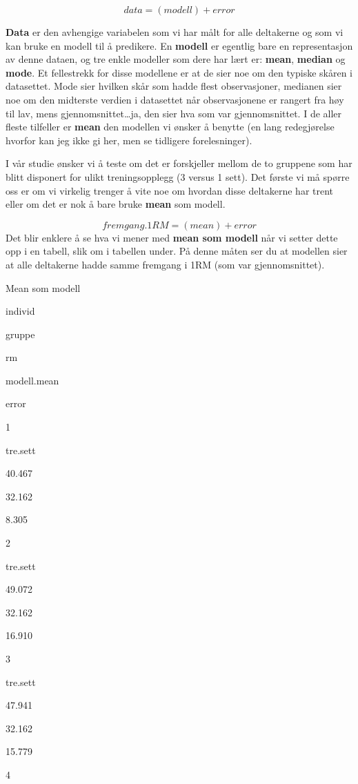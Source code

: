 \documentclass[
]{book}
\begin{document}
\[
data = (modell) + error
\]

\textbf{Data} er den avhengige variabelen som vi har målt for alle deltakerne og som vi kan bruke en modell til å predikere. En \textbf{modell} er egentlig bare en representasjon av denne dataen, og tre enkle modeller som dere har lært er: \textbf{mean}, \textbf{median} og \textbf{mode}. Et fellestrekk for disse modellene er at de sier noe om den typiske skåren i datasettet. Mode sier hvilken skår som hadde flest observasjoner, medianen sier noe om den midterste verdien i datasettet når observasjonene er rangert fra høy til lav, mens gjennomsnittet\ldots ja, den sier hva som var gjennomsnittet. I de aller fleste tilfeller er \textbf{mean} den modellen vi ønsker å benytte (en lang redegjørelse hvorfor kan jeg ikke gi her, men se tidligere forelesninger).

I vår studie ønsker vi å teste om det er forskjeller mellom de to gruppene som har blitt disponert for ulikt treningsopplegg (3 versus 1 sett). Det første vi må spørre oss er om vi virkelig trenger å vite noe om hvordan disse deltakerne har trent eller om det er nok å bare bruke \textbf{mean} som modell.

\[
fremgang.1RM = (mean) + error
\]
Det blir enklere å se hva vi mener med \textbf{mean som modell} når vi setter dette opp i en tabell, slik om i tabellen under. På denne måten ser du at modellen sier at alle deltakerne hadde samme fremgang i 1RM (som var gjennomsnittet).

\label{tab:unnamed-chunk-3}Mean som modell

individ

gruppe

rm

modell.mean

error

1

tre.sett

40.467

32.162

8.305

2

tre.sett

49.072

32.162

16.910

3

tre.sett

47.941

32.162

15.779

4
\end{document}
